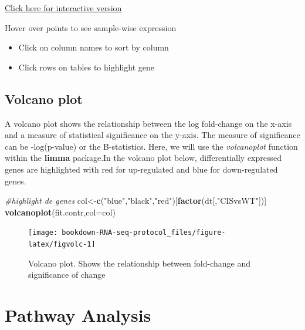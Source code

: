 \documentclass[]{book}
\newenvironment{Shaded}{\begin{snugshade}}{\end{snugshade}}
\newcommand{\CommentTok}[1]{\textcolor[rgb]{0.56,0.35,0.01}{\textit{#1}}}
\newcommand{\DataTypeTok}[1]{\textcolor[rgb]{0.13,0.29,0.53}{#1}}
\newcommand{\KeywordTok}[1]{\textcolor[rgb]{0.13,0.29,0.53}{\textbf{#1}}}
\newcommand{\NormalTok}[1]{#1}
\newcommand{\StringTok}[1]{\textcolor[rgb]{0.31,0.60,0.02}{#1}}
\begin{document}
\href{glimma-plots/MD-Plot.html}{Click here for interactive version}

Hover over points to see sample-wise expression

\begin{itemize}
\item
  Click on column names to sort by column
\item
  Click rows on tables to highlight gene
\end{itemize}

\hypertarget{volcano-plot}{%
\subsection{Volcano plot}\label{volcano-plot}}

A volcano plot shows the relationship between the log fold-change on the x-axis and a measure of statistical significance on the y-axis. The measure of significance can be -log(p-value) or the B-statistics. Here, we will use the \emph{volcanoplot} function within the \textbf{limma} package.In the volcano plot below, differentially expressed genes are highlighted with red for up-regulated and blue for down-regulated genes.

\begin{Shaded}
\begin{Highlighting}[]
\CommentTok{#highlight de genes}
\NormalTok{col<-}\KeywordTok{c}\NormalTok{(}\StringTok{"blue"}\NormalTok{,}\StringTok{"black"}\NormalTok{,}\StringTok{"red"}\NormalTok{)[}\KeywordTok{factor}\NormalTok{(dt[,}\StringTok{"CISvsWT"}\NormalTok{])]}
\KeywordTok{volcanoplot}\NormalTok{(fit.contr,}\DataTypeTok{col=}\NormalTok{col)}
\end{Highlighting}
\end{Shaded}

\begin{figure}

{\centering \texttt{[image: bookdown-RNA-seq-protocol\_files/figure-latex/figvolc-1]} 

}

\caption{Volcano plot. Shows the relationship between fold-change and significance of change}\label{fig:figvolc}
\end{figure}

\hypertarget{pathway-analysis}{%
\section{Pathway Analysis}\label{pathway-analysis}}
\end{document}
